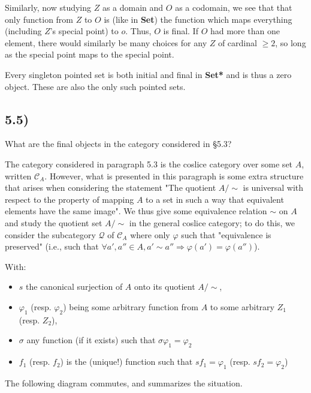 \documentclass[12pt, letterpaper, twoside]{report}
\begin{document}
Similarly, now studying $Z$ as a domain and $O$ as a codomain, we see that that only function from $Z$ to $O$ is (like in \textbf{Set}) the function which maps everything (including $Z$'s special point) to $o$. Thus, $O$ is final. If $O$ had more than one element, there would similarly be many choices for any $Z$ of cardinal $\geq 2$, so long as the special point maps to the special point.

Every singleton pointed set is both initial and final in \textbf{Set*} and is thus a zero object. These are also the only such pointed sets.



\subsection*{5.5)}

What are the final objects in the category considered in §5.3?

The category considered in paragraph 5.3 is the coslice category over some set $A$, written $\mathcal{C}_A$. However, what is presented in this paragraph is some extra structure that arises when considering the statement "The quotient $A/\sim$ is universal with respect to the property of mapping $A$ to a set in such a way that equivalent elements have the same image". We thus give some equivalence relation $\sim$ on $A$ and study the quotient set $A/\sim$ in the general coslice category; to do this, we consider the subcategory $\mathcal{Q}$ of $\mathcal{C}_A$ where only $\varphi$ such that "equivalence is preserved" (i.e., such that $\forall a', a'' \in A, a' \sim a'' \Rightarrow \varphi(a') = \varphi(a'')$).

With:
\begin{itemize}
	\item $s$ the canonical surjection of $A$ onto its quotient $A/\sim$,
	\item $\varphi_1$ (resp. $\varphi_2$) being some arbitrary function from $A$ to some arbitrary $Z_1$ (resp. $Z_2$),
	\item $\sigma$ any function (if it exists) such that $\sigma \varphi_1 = \varphi_2$
	\item $f_1$ (resp. $f_2$) is the (unique!) function such that $s f_1 = \varphi_1$ (resp. $s f_2 = \varphi_2$)
\end{itemize}

The following diagram commutes, and summarizes the situation.

\end{document}

